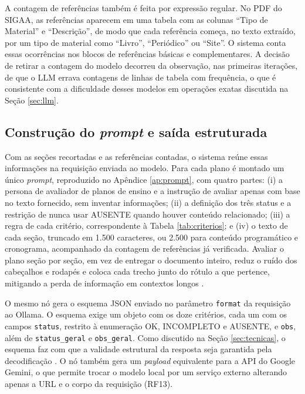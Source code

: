 A contagem de referências também é feita por expressão regular. No PDF do SIGAA, as referências aparecem em uma tabela com as colunas ``Tipo de Material'' e ``Descrição'', de modo que cada referência começa, no texto extraído, por um tipo de material como ``Livro'', ``Periódico'' ou ``Site''. O sistema conta essas ocorrências nos blocos de referências básicas e complementares. A decisão de retirar a contagem do modelo decorreu da observação, nas primeiras iterações, de que o LLM errava contagens de linhas de tabela com frequência, o que é consistente com a dificuldade desses modelos em operações exatas discutida na Seção \ref{sec:llm}.

\subsection{Construção do \textit{prompt} e saída estruturada}

Com as seções recortadas e as referências contadas, o sistema reúne essas informações na requisição enviada ao modelo. Para cada plano é montado um único \textit{prompt}, reproduzido no Apêndice \ref{ap:prompt}, com quatro partes: (i) a persona de avaliador de planos de ensino e a instrução de avaliar apenas com base no texto fornecido, sem inventar informações; (ii) a definição dos três status e a restrição de nunca usar AUSENTE quando houver conteúdo relacionado; (iii) a regra de cada critério, correspondente à Tabela \ref{tab:criterios}; e (iv) o texto de cada seção, truncado em 1.500 caracteres, ou 2.500 para conteúdo programático e cronograma, acompanhado da contagem de referências já verificada. Avaliar o plano seção por seção, em vez de entregar o documento inteiro, reduz o ruído dos cabeçalhos e rodapés e coloca cada trecho junto do rótulo a que pertence, mitigando a perda de informação em contextos longos \cite{Liu2024}.

O mesmo nó gera o esquema JSON enviado no parâmetro \texttt{format} da requisição ao Ollama. O esquema exige um objeto com os doze critérios, cada um com os campos \texttt{status}, restrito à enumeração OK, INCOMPLETO e AUSENTE, e \texttt{obs}, além de \texttt{status\_geral} e \texttt{obs\_geral}. Como discutido na Seção \ref{sec:tecnicas}, o esquema faz com que a validade estrutural da resposta seja garantida pela decodificação \cite{Willard2023, OllamaStructured}. O nó também gera um \textit{payload} equivalente para a API do Google Gemini, o que permite trocar o modelo local por um serviço externo alterando apenas a URL e o corpo da requisição (RF13).

